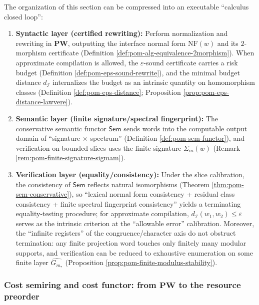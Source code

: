 \begin{remark}\label{rem:pom-rewrite-semantic-check-loop}
The organization of this section can be compressed into an executable ``calculus closed loop'':
\begin{enumerate}
  \item \textbf{Syntactic layer (certified rewriting):}
  Perform normalization and rewriting in \(\mathbf{PW}\), outputting the interface normal form \(\mathrm{NF}(w)\) and its \(2\)-morphism certificate (Definition \ref{def:pom-alg-equivalence-2morphism}).
  When approximate compilation is allowed, the \(\varepsilon\)-sound certificate carries a risk budget (Definition \ref{def:pom-eps-sound-rewrite}), and the minimal budget distance \(d_{\mathcal I}\) internalizes the budget as an intrinsic quantity on homomorphism classes (Definition \ref{def:pom-eps-distance}; Proposition \ref{prop:pom-eps-distance-lawvere}).
  \item \textbf{Semantic layer (finite signature/spectral fingerprint):}
  The conservative semantic functor \(\mathsf{Sem}\) sends words into the computable output domain of ``signature \(\times\) spectrum'' (Definition \ref{def:pom-sem-functor}), and verification on bounded slices uses the finite signature \(\Sigma_m(w)\) (Remark \ref{rem:pom-finite-signature-sigmam}).
  \item \textbf{Verification layer (equality/consistency):}
  Under the slice calibration, the consistency of \(\mathsf{Sem}\) reflects natural isomorphisms (Theorem \ref{thm:pom-sem-conservative}), so ``lexical normal form consistency + residual class consistency + finite spectral fingerprint consistency'' yields a terminating equality-testing procedure;
  for approximate compilation, \(d_{\mathcal I}(w_1,w_2)\le\varepsilon\) serves as the intrinsic criterion at the ``allowable error'' calibration.
  Moreover, the ``infinite registers'' of the congruence/character axis do not obstruct termination: any finite projection word touches only finitely many modular supports, and verification can be reduced to exhaustive enumeration on some finite layer \(\widehat{G_{m_\ast}}\) (Proposition \ref{prop:pom-finite-modulus-stability}).
\end{enumerate}
\end{remark}

\subsubsection{Cost semiring and cost functor: from \texorpdfstring{$\mathbf{PW}$}{PW} to the resource preorder}\label{subsec:pom-cost-functor}
